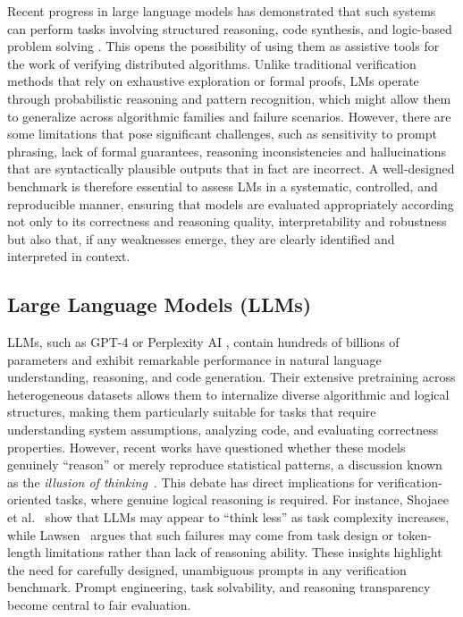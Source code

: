 Recent progress in large language models has demonstrated that such systems can perform tasks involving structured reasoning, code synthesis, and logic-based problem solving \cite{chen2021codex,li2023starcoder}. 
This opens the possibility of using them as assistive tools for the work of verifying distributed algorithms. 
Unlike traditional verification methods that rely on exhaustive exploration or formal proofs, LMs operate through probabilistic reasoning and pattern recognition, which might allow them to generalize across algorithmic families and failure scenarios. 
However, there are some limitations that pose significant challenges, such as sensitivity to prompt phrasing, lack of formal guarantees, reasoning inconsistencies and hallucinations that are syntactically plausible outputs that in fact are incorrect\cite{islam2023comprehensive}. A well-designed benchmark is therefore essential to assess LMs in a systematic, controlled, and reproducible manner, ensuring that models are evaluated appropriately according not only to its correctness and reasoning quality, interpretability and robustness but also that, if any weaknesses emerge, they are clearly identified and interpreted in context.

\subsection{Large Language Models (LLMs)}
LLMs, such as GPT-4 \cite{openai2024gpt4} or Perplexity AI \cite{perplexity2025}, contain hundreds of billions of parameters and exhibit remarkable performance in natural language understanding, reasoning, and code generation. Their extensive pretraining across heterogeneous datasets allows them to internalize diverse algorithmic and logical structures, making them particularly suitable for tasks that require understanding system assumptions, analyzing code, and evaluating correctness properties.
However, recent works have questioned whether these models genuinely “reason” or merely reproduce statistical patterns, a discussion known as the \textit{illusion of thinking}~\cite{shojaee2024illusion, lawsen2024illusion2}. 
This debate has direct implications for verification-oriented tasks, where genuine logical reasoning is required. 
For instance, Shojaee et al.~\cite{shojaee2024illusion} show that LLMs may appear to “think less” as task complexity increases, while Lawsen~\cite{lawsen2024illusion2} argues that such failures may come from task design or token-length limitations rather than lack of reasoning ability. 
These insights highlight the need for carefully designed, unambiguous prompts in any verification benchmark. 
Prompt engineering, task solvability, and reasoning transparency become central to fair evaluation.

